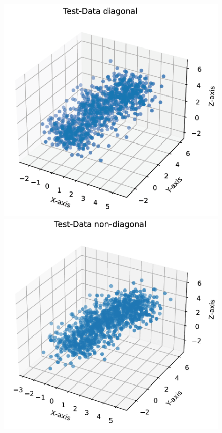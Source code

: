 \documentclass[DIV=12, ngerman, fontsize=12pt, parskip=half]{scrreprt}
\begin{document}
	\begin{figure}[H]
	\begin{center}
		\begin{minipage}[t]{0.4\textwidth}
			\includegraphics[width=\textwidth]{Task1_TestData_diag_png}
		\end{minipage}
		\begin{minipage}[t]{0.4\textwidth}
			\includegraphics[width=\textwidth]{Task1_TestData_non_diag_png}
		\end{minipage}
	\end{center}
	\end{figure}
\end{document}

